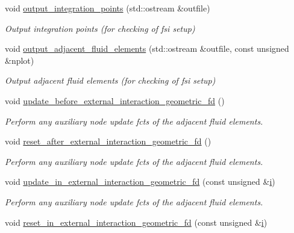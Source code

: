 \begin{DoxyCompactItemize}
void \hyperlink{classoomph_1_1FSIAxisymFoepplvonKarmanElement_a8c7be29df60b6ed699d585c9e175333b}{output\+\_\+integration\+\_\+points} (std\+::ostream \&outfile)
\begin{DoxyCompactList}\small\item\em Output integration points (for checking of fsi setup) \end{DoxyCompactList}\item 
void \hyperlink{classoomph_1_1FSIAxisymFoepplvonKarmanElement_a61bf4a77d5d6b44c037c2fa9d9e9453d}{output\+\_\+adjacent\+\_\+fluid\+\_\+elements} (std\+::ostream \&outfile, const unsigned \&nplot)
\begin{DoxyCompactList}\small\item\em Output adjacent fluid elements (for checking of fsi setup) \end{DoxyCompactList}\item 
void \hyperlink{classoomph_1_1FSIAxisymFoepplvonKarmanElement_a4ab5ac225a4ecbd709e8bb5ce752f939}{update\+\_\+before\+\_\+external\+\_\+interaction\+\_\+geometric\+\_\+fd} ()
\begin{DoxyCompactList}\small\item\em Perform any auxiliary node update fcts of the adjacent fluid elements. \end{DoxyCompactList}\item 
void \hyperlink{classoomph_1_1FSIAxisymFoepplvonKarmanElement_a1c8b7e327f305f8399e4d9a2d5deddff}{reset\+\_\+after\+\_\+external\+\_\+interaction\+\_\+geometric\+\_\+fd} ()
\begin{DoxyCompactList}\small\item\em Perform any auxiliary node update fcts of the adjacent fluid elements. \end{DoxyCompactList}\item 
void \hyperlink{classoomph_1_1FSIAxisymFoepplvonKarmanElement_ac3284ec67a975078466ec03d55f65416}{update\+\_\+in\+\_\+external\+\_\+interaction\+\_\+geometric\+\_\+fd} (const unsigned \&\hyperlink{cfortran_8h_adb50e893b86b3e55e751a42eab3cba82}{i})
\begin{DoxyCompactList}\small\item\em Perform any auxiliary node update fcts of the adjacent fluid elements. \end{DoxyCompactList}\item 
void \hyperlink{classoomph_1_1FSIAxisymFoepplvonKarmanElement_aea15fbe491357b33db4b0de7df957314}{reset\+\_\+in\+\_\+external\+\_\+interaction\+\_\+geometric\+\_\+fd} (const unsigned \&\hyperlink{cfortran_8h_adb50e893b86b3e55e751a42eab3cba82}{i})

\end{DoxyCompactItemize}
